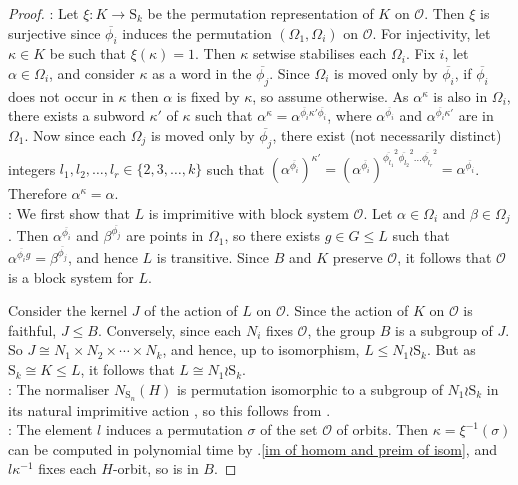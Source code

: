 \documentclass[11pt,a4paper]{article}
\theoremstyle{definition}
\theoremstyle{remark}
\newcommand{\Sy}{\mathrm{S}}
\begin{document}
\begin{proof}
:
Let $\xi: K \rightarrow \Sy_k$ be the permutation representation of $K$ on $\mathcal{O}$. Then $\xi$ is surjective since $\overline{\phi_i}$ induces the permutation $(\Omega_1,\Omega_i)$ on $\mathcal{O}$. 
For injectivity, let $\kappa \in K$ be such that $\xi(\kappa)=1$.
Then $\kappa$ setwise stabilises each $\Omega_i$. 
Fix $i$, let $\alpha \in \Omega_i$, and consider $\kappa$ as a word in the $\overline{\phi_j}$. 
Since $\Omega_i$ is moved only by $\overline{\phi_i}$, if $\overline{\phi_i}$ does not occur in $\kappa$ then $\alpha$ is fixed by $\kappa$, so assume otherwise. 
As $\alpha^\kappa$ is also in $\Omega_i$, there exists a subword $\kappa'$ of $\kappa$ such that $\alpha^{\kappa} = \alpha^{\overline{\phi_i} \kappa' \overline{\phi_i}}$, where $\alpha^{\overline{\phi_i}}$ and $\alpha^{\overline{\phi_i} \kappa'}$ are in $\Omega_1$. 
Now since each $\Omega_j$ is moved only by $\overline{\phi_j}$, 
there exist (not necessarily distinct) integers $l_1, l_2, \ldots, l_r \in \{2,3, \ldots, k\} $ such that $(\alpha^{\overline{\phi_i}})^{\kappa'} = (\alpha^{\overline{\phi_i}})^{ \overline{\phi_{l_1}}^2 \overline{\phi_{l_2}}^2 \ldots \overline{\phi_{l_r}}^2 } = \alpha^{\overline{\phi_i}} $.
Therefore $\alpha^\kappa = \alpha$. \\
:
We first show that $L$ is imprimitive with block system $\mathcal{O}$.
Let $\alpha \in \Omega_i$ and $ \beta \in \Omega_j$.
Then $\alpha^{\overline{\phi_i}}$ and $ \beta^{\overline{\phi_j}}$ are points in $\Omega_1$, so there exists $g \in G \leq L$ such that $\alpha^{\overline{\phi_i}g} = \beta^{\overline{\phi_j}}$, and hence $L$ is transitive. Since $B$ and $K$ preserve $\mathcal{O}$, it follows that $\mathcal{O}$ is a block system for $L$. 

Consider the kernel $J$ of the action of $L$ on $\mathcal{O}$.
Since the action of $K$ on $\mathcal{O}$ is faithful, $J \leq B$. 
Conversely, since each $N_i$ fixes $\mathcal{O}$, the group $B$ is a subgroup of $J$. 
So $J \cong N_1 \times N_2 \times \cdots \times N_k$, and hence, up to isomorphism, $L \leq N_1 \wr \Sy_k$. 
But as $\Sy_k \cong K \leq L$, it follows that $L \cong N_1 \wr \Sy_k$. \\
: The normaliser $N_{\Sy_n}(H)$ is permutation isomorphic to a subgroup of $N_1 \wr \Sy_k$ in its natural imprimitive action \cite[\S11]{hulpkeTransitive}, so this follows from .  \\
: 
The element $l$ induces a permutation $\sigma$ of the set $\mathcal{O}$ of orbits. 
Then $\kappa = \xi^{-1}(\sigma)$ can be computed in polynomial time by .\ref{im of homom and preim of isom}, and $l \kappa^{-1}$ fixes each $H$-orbit, so is in $B$. 
\end{proof}
\end{document}
